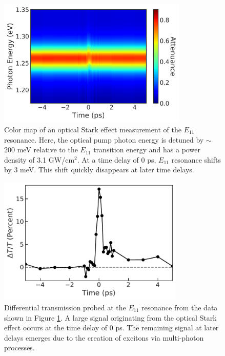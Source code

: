 \begin{figure}[ht]
  \centering
  \includegraphics[height=2.4in]{images/chapter_coherent/ose_abs_map}
  \caption{ Color map of an optical Stark effect measurement of the $E_{11}$ resonance. Here, the optical pump photon energy is detuned by $\sim$200 meV relative to the $E_{11}$ transition energy and has a power density of 3.1 GW/cm$^2$. At a time delay of 0 ps, $E_{11}$ resonance shifts by 3 meV. This shift quickly disappears at later time delays. }
  \label{fig:ose_color_map}
\end{figure}

\begin{figure}[ht]
  \centering
  \includegraphics[height=2.4in]{images/chapter_coherent/ose_dt}
  \caption{Differential transmission probed at the $E_{11}$ resonance from the data shown in Figure \ref{fig:ose_color_map}. A large signal originating from the optical Stark effect occurs at the time delay of 0 ps. The remaining signal at later delays emerges due to the creation of excitons via multi-photon processes. }
  \label{fig:ose_dtt}
\end{figure}

